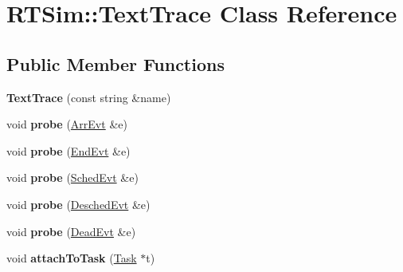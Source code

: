 \hypertarget{classRTSim_1_1TextTrace}{}\section{R\+T\+Sim\+:\+:Text\+Trace Class Reference}
\label{classRTSim_1_1TextTrace}
\subsection*{Public Member Functions}
\begin{DoxyCompactItemize}
\item 
{\bfseries Text\+Trace} (const string \&name)\hypertarget{classRTSim_1_1TextTrace_a125e68e8037f014a94ed58a9dc809425}{}\label{classRTSim_1_1TextTrace_a125e68e8037f014a94ed58a9dc809425}

\item 
void {\bfseries probe} (\hyperlink{classRTSim_1_1ArrEvt}{Arr\+Evt} \&e)\hypertarget{classRTSim_1_1TextTrace_a069de063690f50e7072d35027ff8c059}{}\label{classRTSim_1_1TextTrace_a069de063690f50e7072d35027ff8c059}

\item 
void {\bfseries probe} (\hyperlink{classRTSim_1_1EndEvt}{End\+Evt} \&e)\hypertarget{classRTSim_1_1TextTrace_a8e103d3a1ae4dc8aff37f70068fe6b29}{}\label{classRTSim_1_1TextTrace_a8e103d3a1ae4dc8aff37f70068fe6b29}

\item 
void {\bfseries probe} (\hyperlink{classRTSim_1_1SchedEvt}{Sched\+Evt} \&e)\hypertarget{classRTSim_1_1TextTrace_a8c19ebe8e54968d22b6914dfc8c356d8}{}\label{classRTSim_1_1TextTrace_a8c19ebe8e54968d22b6914dfc8c356d8}

\item 
void {\bfseries probe} (\hyperlink{classRTSim_1_1DeschedEvt}{Desched\+Evt} \&e)\hypertarget{classRTSim_1_1TextTrace_a5766a5f52d077c4910868ff7ff32c587}{}\label{classRTSim_1_1TextTrace_a5766a5f52d077c4910868ff7ff32c587}

\item 
void {\bfseries probe} (\hyperlink{classRTSim_1_1DeadEvt}{Dead\+Evt} \&e)\hypertarget{classRTSim_1_1TextTrace_ab090eb9c737b015f9b721b6a0fb17184}{}\label{classRTSim_1_1TextTrace_ab090eb9c737b015f9b721b6a0fb17184}

\item 
void {\bfseries attach\+To\+Task} (\hyperlink{classRTSim_1_1Task}{Task} $\ast$t)\hypertarget{classRTSim_1_1TextTrace_afc6d92d19ebf84157a930c097cdb21c3}{}\label{classRTSim_1_1TextTrace_afc6d92d19ebf84157a930c097cdb21c3}

\end{DoxyCompactItemize}

